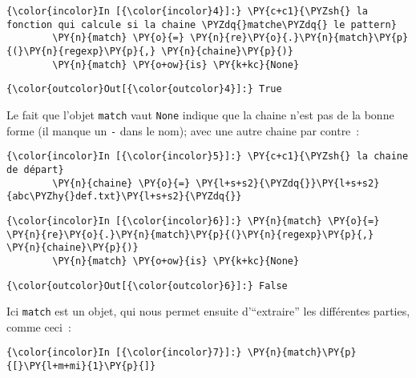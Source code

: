     \begin{Verbatim}[commandchars=\\\{\},frame=single,framerule=0.3mm,rulecolor=\color{cellframecolor}]
{\color{incolor}In [{\color{incolor}4}]:} \PY{c+c1}{\PYZsh{} la fonction qui calcule si la chaine \PYZdq{}matche\PYZdq{} le pattern}
        \PY{n}{match} \PY{o}{=} \PY{n}{re}\PY{o}{.}\PY{n}{match}\PY{p}{(}\PY{n}{regexp}\PY{p}{,} \PY{n}{chaine}\PY{p}{)}
        \PY{n}{match} \PY{o+ow}{is} \PY{k+kc}{None}
\end{Verbatim}


\begin{Verbatim}[commandchars=\\\{\},frame=single,framerule=0.3mm,rulecolor=\color{cellframecolor}]
{\color{outcolor}Out[{\color{outcolor}4}]:} True
\end{Verbatim}
            
    Le fait que l'objet \texttt{match} vaut \texttt{None} indique que la
chaine n'est pas de la bonne forme (il manque un \texttt{-} dans le
nom); avec une autre chaine par contre~:

    \begin{Verbatim}[commandchars=\\\{\},frame=single,framerule=0.3mm,rulecolor=\color{cellframecolor}]
{\color{incolor}In [{\color{incolor}5}]:} \PY{c+c1}{\PYZsh{} la chaine de départ}
        \PY{n}{chaine} \PY{o}{=} \PY{l+s+s2}{\PYZdq{}}\PY{l+s+s2}{abc\PYZhy{}def.txt}\PY{l+s+s2}{\PYZdq{}}
\end{Verbatim}


    \begin{Verbatim}[commandchars=\\\{\},frame=single,framerule=0.3mm,rulecolor=\color{cellframecolor}]
{\color{incolor}In [{\color{incolor}6}]:} \PY{n}{match} \PY{o}{=} \PY{n}{re}\PY{o}{.}\PY{n}{match}\PY{p}{(}\PY{n}{regexp}\PY{p}{,} \PY{n}{chaine}\PY{p}{)}
        \PY{n}{match} \PY{o+ow}{is} \PY{k+kc}{None}
\end{Verbatim}


\begin{Verbatim}[commandchars=\\\{\},frame=single,framerule=0.3mm,rulecolor=\color{cellframecolor}]
{\color{outcolor}Out[{\color{outcolor}6}]:} False
\end{Verbatim}
            
    Ici \texttt{match} est un objet, qui nous permet ensuite d'``extraire''
les différentes parties, comme ceci~:

    \begin{Verbatim}[commandchars=\\\{\},frame=single,framerule=0.3mm,rulecolor=\color{cellframecolor}]
{\color{incolor}In [{\color{incolor}7}]:} \PY{n}{match}\PY{p}{[}\PY{l+m+mi}{1}\PY{p}{]}
\end{Verbatim}



